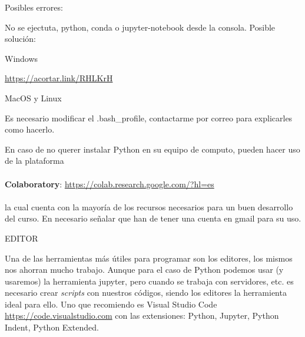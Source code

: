 \documentclass[12pt]{amsart} %
\begin{document}
Posibles errores:
\vspace{8pt}

No se ejectuta, python, conda o jupyter-notebook desde la consola. Posible solución:

\vspace{8pt}
Windows

\url{https://acortar.link/RHLKrH}

\vspace{8pt}
MacOS y Linux

Es necesario modificar el .bash\_profile, contactarme por correo para explicarles como hacerlo. 

\vspace{14pt}

En caso de no querer instalar Python en su equipo de computo, pueden hacer uso de la plataforma 
\\~\\
\textbf{Colaboratory}: \url{https://colab.research.google.com/?hl=es}
\\~\\
la cual cuenta con la mayoría de los recursos necesarios para un buen desarrollo del curso. En necesario señalar que han de tener una cuenta en gmail para su uso.


\vspace{14pt}

\parbox[c]{235pt}{EDITOR}
\vspace{8pt}

Una de las herramientas más útiles para programar son los editores, los mismos nos ahorran mucho trabajo. Aunque para el caso de Python podemos usar (y usaremos) la herramienta jupyter, pero cuando se trabaja con servidores, etc. es necesario crear \textit{scripts} con nuestros códigos, siendo los editores la herramienta ideal para ello.  Uno que recomiendo es Visual Studio Code \url{https://code.visualstudio.com} con las extensiones: Python, Jupyter, Python Indent, Python Extended.

\end{document}
